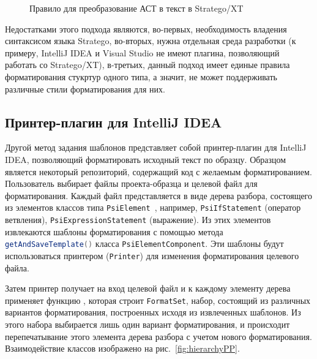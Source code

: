 

\begin{figure}[h]
	\centering
	
	\caption{Правило для преобразование АСТ в текст в Stratego/XT}
	\label{fig:strategopp}
\end{figure}


Недостатками этого подхода являются, во-первых, необходимость владения синтаксисом языка Stratego, во-вторых, нужна отдельная среда разработки (к примеру, IntelliJ IDEA и Visual Studio не имеют плагина, позволяющий работать со Stratego/XT), в-третьих, данный подход имеет единые правила форматирования стукртур одного типа, а значит, не может поддерживать различные стили форматирования для них.

\subsection{Принтер-плагин для IntelliJ IDEA}
Другой метод задания шаблонов представляет собой принтер-плагин для IntelliJ IDEA, позволяющий форматировать исходный текст по образцу. Образцом является некоторый репозиторий, содержащий код с желаемым форматированием.
Пользователь выбирает файлы проекта-образца и целевой файл для форматирования. Каждый файл представляется в виде дерева разбора, состоящего из элементов классов типа \lstinline[language=Java]{PsiElement}~\cite{intellij:plugdev}, например, \lstinline[language=Java]{PsiIfStatement} (оператор ветвления), \lstinline[language=Java]{PsiExpressionStatement} (выражение). Из этих элементов извлекаются шаблоны 
форматирования с помощью метода \lstinline[language=Java]{getAndSaveTemplate()} 
класса \lstinline[language=Java]{PsiElementComponent}. Эти шаблоны будут 
использоваться принтером (\lstinline[language=Java]{Printer}) для изменения 
форматирования целевого файла.

Затем принтер получает на вход целевой файл и к каждому элементу дерева 
применяет функцию%
, которая строит 
\lstinline[language=Java]{FormatSet}, набор, состоящий из различных вариантов 
форматирования, построенных исходя из извлеченных шаблонов. Из этого набора
выбирается лишь один вариант форматирования, и происходит перепечатывание
этого элемента дерева разбора с учетом нового форматирования.
Взаимодействие классов изображено на рис.~\ref{fig:hierarchyPP}.

